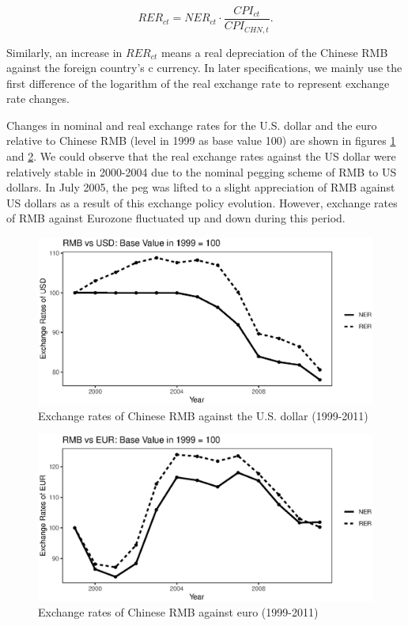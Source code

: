 \documentclass[12pt]{article}
\begin{document}
$$
RER_{ct}=NER_{ct} \cdot \frac{CPI_{ct}}{CPI_{CHN,t}}.
$$

Similarly, an increase in $RER_{ct}$ means a real depreciation of the Chinese RMB against the foreign country's c currency. In later specifications, we mainly use the first difference of the logarithm of the real exchange rate to represent exchange rate changes.

Changes in nominal and real exchange rates for the U.S. dollar and the euro relative to Chinese RMB (level in 1999 as base value 100) are shown in figures \ref{fig.USD} and \ref{fig.EUR}. We could observe that the real exchange rates against the US dollar were relatively stable in 2000-2004 due to the nominal pegging scheme of RMB to US dollars. In July 2005, the peg was lifted to a slight appreciation of RMB against US dollars as a result of this exchange policy evolution. However, exchange rates of RMB against Eurozone fluctuated up and down during this period. 

\begin{figure}[htbp]
	\centering
	\includegraphics[width=1\textwidth]{R/USD.eps}
	\caption{Exchange rates of Chinese RMB against the U.S. dollar (1999-2011)}
	\label{fig.USD}
\end{figure}

\begin{figure}[htbp]
	\centering
	\includegraphics[width=1\textwidth]{R/EUR.eps}
	\caption{Exchange rates of Chinese RMB against euro (1999-2011)}
	\label{fig.EUR}
\end{figure}
\end{document}
